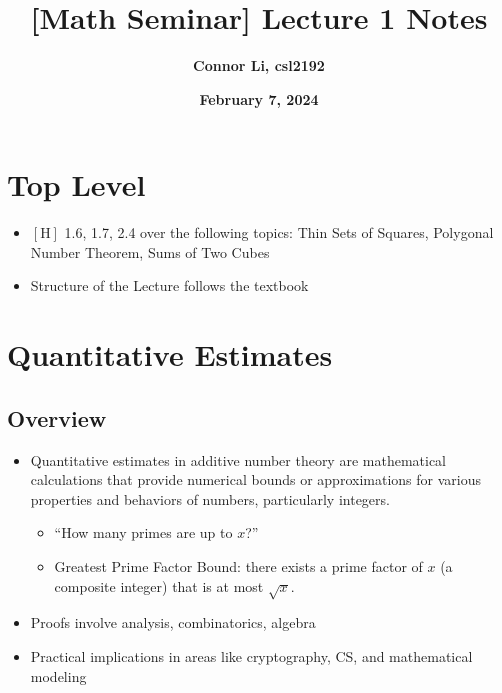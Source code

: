 \documentclass[8pt]{extarticle}
\title{\textbf{[Math Seminar] Lecture 1 Notes}}
\author{\textbf{Connor Li, csl2192}}
\date{\textbf{February 7, 2024}}
\begin{document}
\maketitle


\section{Top Level}
\begin{itemize}
    \item $[\text{H}]$ 1.6, 1.7, 2.4 over the following topics: Thin Sets of Squares, Polygonal Number Theorem, Sums of Two Cubes
    \item Structure of the Lecture follows the textbook
\end{itemize}


\section{Quantitative Estimates}
\subsection{Overview}
\begin{itemize}
    \item Quantitative estimates in additive number theory are mathematical calculations that provide numerical bounds or approximations for various properties and behaviors of numbers, particularly integers.
    \begin{itemize}
        \item ``How many primes are up to $x$?''
        \item Greatest Prime Factor Bound: there exists a prime factor of $x$ (a composite integer) that is at most $\sqrt{x}$. 
    \end{itemize}
    \item Proofs involve analysis, combinatorics, algebra
    \item Practical implications in areas like cryptography, CS, and mathematical modeling
\end{itemize}
\end{document}
